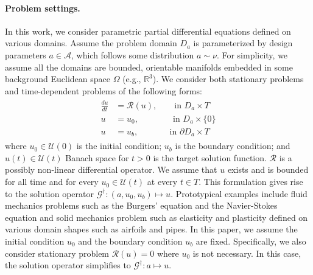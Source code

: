 \documentclass{article}
\newcommand{\R}{\mathbb{R}}
\newcommand{\Gtrue}{\mathcal{G}^{\dagger}}
\begin{document}
\paragraph{Problem settings.}
In this work, we consider parametric partial differential equations defined on various domains. Assume the problem domain $D_{a}$ is parameterized by design parameters $a \in \mathcal{A}$, which follows some distribution $a \sim \nu$. For simplicity, we assume all the domains are bounded, orientable manifolds embedded in some background Euclidean space $\Omega$ (e.g., $\R^3$). We consider both stationary problems and time-dependent problems of the following forms:
\begin{align}\label{eq:dynamic}
\begin{split}
    \frac{du}{dt} &= \mathcal{R}(u), \qquad  \text{in } D_{a} \times T \\
    u &= u_0, \qquad \qquad \text{in } D_{a} \times \{0\} \\
    u &= u_b, \qquad \quad \:\:\: \text{in } \partial D_{a} \times T 
\end{split}
\end{align}
where \(u_0 \in \mathcal{U}(0)\) is the initial condition;  \(u_b\) is the boundary condition; and \(u(t) \in \mathcal{U}(t)\) Banach space for \(t > 0\) is the target solution function. \(\mathcal{R}\) is a possibly non-linear differential operator. We assume that \(u\) exists and is bounded for all time and for every $u_0 \in \mathcal{U}(t)$ at every $t \in T$. This formulation gives rise to the solution operator \(\Gtrue : (a, u_0, u_b) \mapsto u\). Prototypical examples include fluid mechanics problems such as the Burgers' equation and the Navier-Stokes equation and solid mechanics problem such as elasticity and plasticity defined on various domain shapes such as airfoils and pipes. In this paper, we assume the initial condition $u_0$ and the boundary condition $u_b$ are fixed. Specifically, we also consider stationary problem $\mathcal{R}(u) = 0$ where $u_0$ is not necessary. In this case, the solution operator simplifies to \(\Gtrue : a \mapsto u\).
\end{document}

